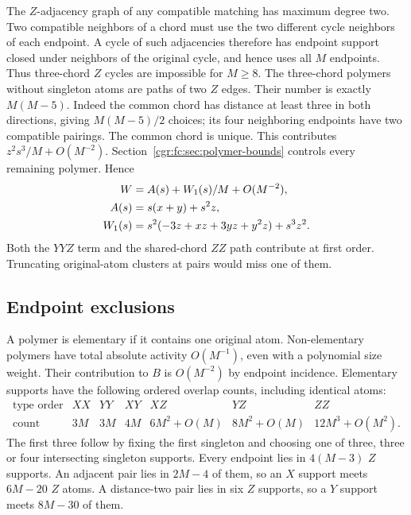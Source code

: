 \documentclass[11pt,letterpaper]{article}
\numberwithin{equation}{section}
\theoremstyle{definition}\newtheorem{definition}[theorem]{Definition}
\theoremstyle{remark}\newtheorem{remark}[theorem]{Remark}
\begin{document}
The $Z$-adjacency graph of any compatible matching has maximum
degree two. Two compatible neighbors of a chord must use the two
different cycle neighbors of each endpoint. A cycle of such
adjacencies therefore has endpoint support closed under neighbors
of the original cycle, and hence uses all $M$ endpoints. Thus
three-chord $Z$ cycles are impossible for $M\ge8$.
The three-chord polymers without singleton atoms are paths of two
$Z$ edges. Their number is exactly $M(M-5)$. Indeed the common
chord has distance at least three in both directions, giving
$M(M-5)/2$ choices; its four neighboring endpoints have two
compatible pairings. The common chord is unique. This contributes
$z^2s^3/M+O(M^{-2})$. Section~\ref{cgr:fc:sec:polymer-bounds} controls
every remaining polymer. Hence
\begin{align}
 W&=A(s)+W_1(s)/M+O(M^{-2}),\label{cgr:fc:eq:W}\\
 A(s)&=s(x+y)+s^2z,\notag\\
 W_1(s)&=s^2(-3z+xz+3yz+y^2z)+s^3z^2.\notag
\end{align}
Both the $YYZ$ term and the shared-chord $ZZ$ path contribute at
first order. Truncating original-atom clusters at pairs would miss
one of them.

\subsection{Endpoint exclusions}
A polymer is elementary if it contains one original atom.
Non-elementary polymers have total absolute activity $O(M^{-1})$,
even with a polynomial size weight. Their contribution to $B$ is
$O(M^{-2})$ by endpoint incidence. Elementary supports have the
following ordered overlap counts, including identical atoms:
\begin{equation}\label{cgr:fc:eq:overlap-table}
\begin{array}{c|rrrrrr}
 \text{type order}&XX&YY&XY&XZ&YZ&ZZ\\\hline
 \text{count}&3M&3M&4M&6M^2+O(M)&8M^2+O(M)&12M^3+O(M^2).
\end{array}
\end{equation}
The first three follow by fixing the first singleton and choosing
one of three, three or four intersecting singleton supports.
Every endpoint lies in $4(M-3)$ $Z$ supports. An adjacent pair
lies in $2M-4$ of them, so an $X$ support meets $6M-20$ $Z$
atoms. A distance-two pair lies in six $Z$ supports, so a $Y$
support meets $8M-30$ of them.
\end{document}
